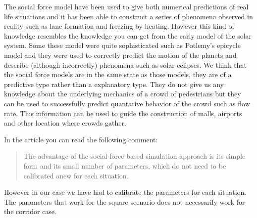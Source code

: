 The social force model have been used to give both numerical predictions of 
real life situations and it has been able to construct a series of phenomena 
observed in reality such as lane formation and freezing by heating.
However this kind of knowledge resembles the knowledge you can get from 
the early model of the solar system. Some these model were quite sophisticated 
such as Potlemy's epicycle model and they were used to correctly predict the 
motion of the planets and describe (although incorrectly) phenomena such as 
solar eclipses.
We think that the social force models are in the same state as those models, 
they are of a predictive type rather than a explanatory type. They do not give 
us any knowledge about the underlying mechanics of a crowd of pedestrians but 
they can be used to successfully predict quantative behavior of the crowd such 
as flow rate. This information can be used to guide the construction of malls, 
airports and other location where crowds gather.

In the article \cite{self-org} you can read the following comment:

\begin{quote}
	The advantage of the social-force-based simulation
	approach is its simple form and its small number of
	parameters, which do not need to be calibrated anew
	for each situation.
\end{quote}

However in our case we have had to calibrate the parameters for each 
situation. The parameters that work for the square scenario does not 
necessarily work for the corridor case.  
